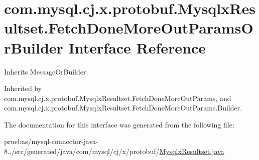 \hypertarget{interfacecom_1_1mysql_1_1cj_1_1x_1_1protobuf_1_1_mysqlx_resultset_1_1_fetch_done_more_out_params_or_builder}{}\section{com.\+mysql.\+cj.\+x.\+protobuf.\+Mysqlx\+Resultset.\+Fetch\+Done\+More\+Out\+Params\+Or\+Builder Interface Reference}
\label{interfacecom_1_1mysql_1_1cj_1_1x_1_1protobuf_1_1_mysqlx_resultset_1_1_fetch_done_more_out_params_or_builder}


Inherits Message\+Or\+Builder.



Inherited by com.\+mysql.\+cj.\+x.\+protobuf.\+Mysqlx\+Resultset.\+Fetch\+Done\+More\+Out\+Params, and com.\+mysql.\+cj.\+x.\+protobuf.\+Mysqlx\+Resultset.\+Fetch\+Done\+More\+Out\+Params.\+Builder.



The documentation for this interface was generated from the following file\+:\begin{DoxyCompactItemize}
\item 
pruebas/mysql-\/connector-\/java-\/8../src/generated/java/com/mysql/cj/x/protobuf/\mbox{\hyperlink{_mysqlx_resultset_8java}{Mysqlx\+Resultset.\+java}}\end{DoxyCompactItemize}
